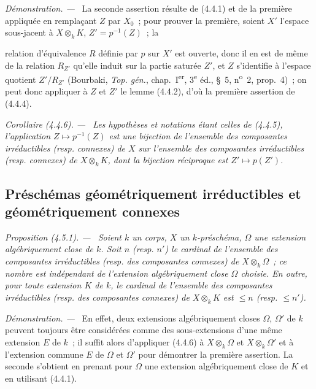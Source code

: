 \documentclass[10pt,oneside]{book}
\newcommand{\oldpage}[2][]{%
  \setcounter{footnote}{0}%
  \marginpar{\scriptsize\textbf{#1}~|~#2}\ignorespaces}
\newenvironment{proposition}[1][]{%
  \par\medskip\noindent\itshape Proposition (#1). ---\ }{\par}
\newenvironment{corollary}[1][]{%
  \par\medskip\noindent\itshape Corollaire (#1). ---\ }{\par}
\newenvironment{proof}{%
  \par\medskip\noindent\textit{Démonstration. ---\ }}{\par}
\begin{document}
\begin{proof}
La seconde assertion résulte de (4.4.1) et de la première appliquée en
remplaçant $Z$ par $X_0$~; pour prouver la première, soient $X'$ l'espace
sous-jacent à $X\otimes_k K$, $Z'=p^{-1}(Z)$~; la

\oldpage[IV-2]{61}

relation d'équivalence $R$ définie par $p$ sur $X'$ est ouverte, donc il en est
de même de la relation $R_{Z'}$ qu'elle induit sur la partie saturée $Z'$, et
$Z$ s'identifie à l'espace quotient $Z'/R_{Z'}$ (Bourbaki,
\emph{Top. gén.}, chap.~I\textsuperscript{er}, 3\textsuperscript{e} éd.,
\S~5, n\textsuperscript{o}~2, prop.~4)~; on peut donc appliquer à $Z$ et $Z'$
le lemme (4.4.2), d'où la première assertion de (4.4.4).
\end{proof}

\begin{corollary}[4.4.6]
\label{IV.2.4.4.6-fr}
Les hypothèses et notations étant celles de (4.4.5), l'application
$Z\mapsto p^{-1}(Z)$ est une bijection de l'ensemble des composantes
irréductibles (resp. connexes) de $X$ sur l'ensemble des composantes
irréductibles (resp. connexes) de $X\otimes_k K$, dont la bijection réciproque
est $Z'\mapsto p(Z')$.
\end{corollary}

\subsection{Préschémas géométriquement irréductibles et géométriquement
connexes}
\label{subsection:IV.2.4.5-fr}

\begin{proposition}[4.5.1]
\label{IV.2.4.5.1-fr}
Soient $k$ un corps, $X$ un $k$-préschéma, $\Omega$ une extension
algébriquement close de $k$. Soit $n$ (resp. $n'$) le cardinal de l'ensemble
des composantes irréductibles (resp. des composantes connexes) de
$X\otimes_k\Omega$~; ce nombre est indépendant de l'extension algébriquement
close $\Omega$ choisie. En outre, pour toute extension $K$ de $k$, le cardinal
de l'ensemble des composantes irréductibles (resp. des composantes connexes)
de $X\otimes_k K$ est $\leqslant n$ (resp. $\leqslant n'$).
\end{proposition}

\begin{proof}
En effet, deux extensions algébriquement closes $\Omega$, $\Omega'$ de $k$
peuvent toujours être considérées comme des sous-extensions d'une même
extension $E$ de $k$~; il suffit alors d'appliquer (4.4.6) à
$X\otimes_k\Omega$ et $X\otimes_k\Omega'$ et à l'extension commune $E$ de
$\Omega$ et $\Omega'$ pour démontrer la première assertion. La seconde
s'obtient en prenant pour $\Omega$ une extension algébriquement close de $K$
et en utilisant (4.4.1).
\end{proof}
\end{document}
